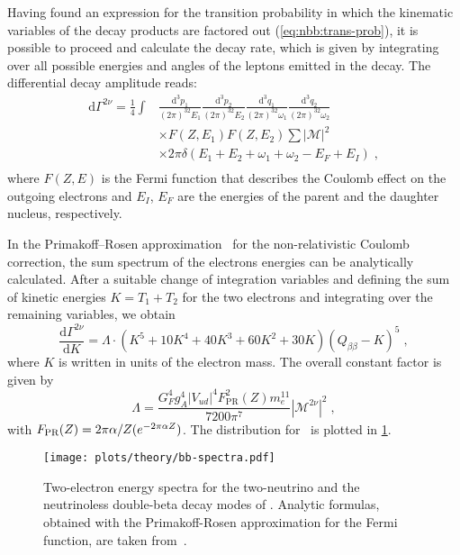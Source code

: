 Having found an expression for the transition probability in which the kinematic
variables of the decay products are factored out (\cref{eq:nbb:trans-prob}), it
is possible to proceed and calculate the decay rate, which is given by
integrating over all possible energies and angles of the leptons emitted in the
decay.  The differential decay amplitude reads:
\[
  \begin{split}
    \text{d}\Gamma^{2\nu} =
      \frac{1}{4} \int & \frac{\text{d}^3p_1}{(2\pi)^32E_1}
                         \frac{\text{d}^3p_2}{(2\pi)^32E_2}
                         \frac{\text{d}^3q_1}{(2\pi)^32\omega_1}
                         \frac{\text{d}^3q_2}{(2\pi)^32\omega_2} \\
                       & \times F(Z,E_1) F(Z,E_2) \sum |\mathcal{M}|^2 \\
                       & \times 2\pi\delta (E_1 + E_2 + \omega_1 +
                         \omega_2 - E_F + E_I) \;, \\
  \end{split}
\]
where $F(Z,E)$ is the Fermi function that describes the Coulomb effect on the
outgoing electrons and $E_I$, $E_F$ are the energies of the parent and the
daughter nucleus, respectively.

In the Primakoff–Rosen approximation~\cite{Primakoff1959} for the
non-relativistic Coulomb correction, the sum spectrum of the electrons energies
can be analytically calculated. After a suitable change of integration
variables and defining the sum of kinetic energies $K=T_1+T_2$ for the two
electrons and integrating over the remaining variables, we obtain
\begin{equation}\label{eq:nbb:stdmodel}
  \frac{\text{d}\Gamma^{2\nu}}{\text{d}K} =
    \Lambda \cdot (K^5+10K^4+40K^3+60K^2+30K) (Q_{\beta\beta}-K)^5 \;,
\end{equation}
where $K$ is written in units of the electron mass. The overall constant factor
is given by
\[
  \Lambda = \frac{G_F^4g_A^4|V_{ud}|^4F^2_\text{PR}(Z)m_e^{11}}{7200\pi^7}
            |\mathcal{M}^{2\nu}|^2 \;,
\]
with $F_\text{PR}(Z) = 2\pi\alpha/Z(\-e^{-2\pi\alpha Z})$. The distribution for
\gesix\ is plotted in \cref{fig:nbb:spectra}.

\begin{figure}
  \centering
  \texttt{[image: plots/theory/bb-spectra.pdf]}
  \caption{%
    Two-electron energy spectra for the two-neutrino and the neutrinoless
    double-beta decay modes of \gesix. Analytic formulas, obtained with the
    Primakoff-Rosen approximation for the Fermi function, are taken
    from~\cite{Tretyak1995, Tretyak2002}.
  }\label{fig:nbb:spectra}
\end{figure}

